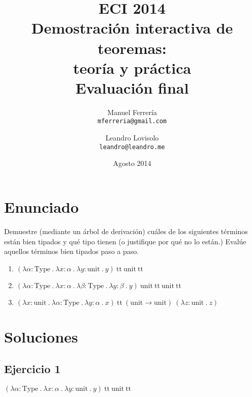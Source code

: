 \documentclass[a4paper]{article}
\begin{document}
\title{ECI 2014\\
       Demostración interactiva de teoremas:\\
       teoría y práctica\\[0.5\baselineskip]
       Evaluación final}
\author{Manuel Ferrería\\
        \texttt{mferreria@gmail.com}
        \and
        Leandro Lovisolo\\
        \texttt{leandro@leandro.me}}
\date{Agosto 2014}
\maketitle

\section{Enunciado}
Demuestre (mediante un árbol de derivación) cuáles de los siguientes términos están bien tipados y qué tipo tienen (o justifique por qué no lo están.) Evalúe aquellos términos bien tipados paso a paso.

\begin{enumerate}
\item $(\lambda \alpha : \text{Type}\ .\
        \lambda x : \alpha\ .\
        \lambda y : \text{unit}\ .\
        y)\
       \text{tt}\ \text{unit}\ \text{tt}$
\item $(\lambda \alpha : \text{Type}\ .\
        \lambda x : \alpha\ .\
        \lambda \beta : \text{Type}\ .\
        \lambda y : \beta\ .\
        y)\
       \text{unit}\ \text{tt}\ \text{unit}\ \text{tt}$
\item $(\lambda x : \text{unit}\ .\
        \lambda \alpha : \text{Type}\ .\
        \lambda y : \alpha\ .\
        x)\
       \text{tt}\ (\text{unit} \rightarrow \text{unit})\
       (\lambda z : \text{unit}\ .\
        z)$
\end{enumerate}

\section{Soluciones}

\subsection{Ejercicio 1}

$(\lambda \alpha : \text{Type}\ .\
  \lambda x : \alpha\ .\
  \lambda y : \text{unit}\ .\
  y)\
 \text{tt}\ \text{unit}\ \text{tt}$\\
\end{document}
